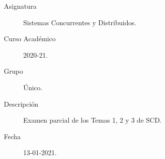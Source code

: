 \documentclass[12pt]{article}
\begin{document}

    
    

    \begin{description}
        \item[Asignatura] Sistemas Concurrentes y Distribuidos.
        \item[Curso Académico] 2020-21.
        \item[Grupo] Único.
        \item[Descripción] Examen parcial de los Temas 1, 2 y 3 de SCD.
        \item[Fecha] 13-01-2021.
    \end{description}
    \newpage


    
\end{document}
